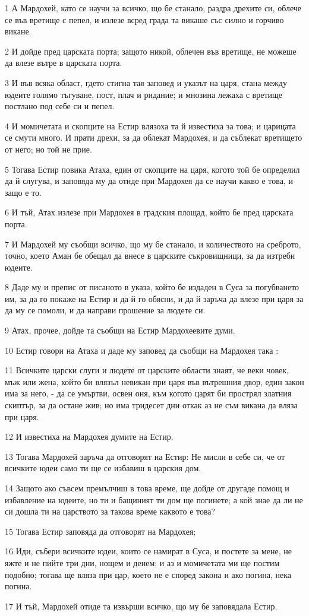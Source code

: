 \par 1 А Мардохей, като се научи за всичко, що бе станало, раздра дрехите си, облече се във вретище с пепел, и излезе всред града та викаше със силно и горчиво викане.
\par 2 И дойде пред царската порта; защото никой, облечен във вретище, не можеше да влезе вътре в царската порта.
\par 3 И във всяка област, гдето стигна тая заповед и указът на царя, стана между юдеите голямо тъгуване, пост, плач и ридание; и мнозина лежаха с вретище постлано под себе си и пепел.
\par 4 И момичетата и скопците на Естир влязоха та й известиха за това; и царицата се смути много. И прати дрехи, за да облекат Мардохея, и да съблекат вретището от него; но той не прие.
\par 5 Тогава Естир повика Атаха, един от скопците на царя, когото той бе определил да й слугува, и заповяда му да отиде при Мардохея да се научи какво е това, и защо е то.
\par 6 И тъй, Атах излезе при Мардохея в градския площад, който бе пред царската порта.
\par 7 И Мардохей му съобщи всичко, що му бе станало, и количеството на среброто, точно, което Аман бе обещал да внесе в царските съкровищници, за да изтреби юдеите.
\par 8 Даде му и препис от писаното в указа, който бе издаден в Суса за погубването им, за да го покаже на Естир и да й го обясни, и да й заръча да влезе при царя за да му се помоли, и да направи прошение за людете си.
\par 9 Атах, прочее, дойде та съобщи на Естир Мардохеевите думи.
\par 10 Естир говори на Атаха и даде му заповед да съобщи на Мардохея така :
\par 11 Всичките царски слуги и людете от царските области знаят, че веки човек, мъж или жена, който би влязъл невикан при царя във вътрешния двор, един закон има за него, - да се умъртви, освен оня, към когото царят би прострял златния скиптър, за да остане жив; но има тридесет дни откак аз не съм викана да вляза при царя.
\par 12 И известиха на Мардохея думите на Естир.
\par 13 Тогава Мардохей заръча да отговорят на Естир: Не мисли в себе си, че от всичките юдеи само ти ще се избавиш в царския дом.
\par 14 Защото ако съвсем премълчиш в това време, ще дойде от другаде помощ и избавление на юдеите, но ти и бащиният ти дом ще погинете; а кой знае да ли не си дошла ти на царството за такова време каквото е това?
\par 15 Тогава Естир заповяда да отговорят на Мардохея;
\par 16 Иди, събери всичките юдеи, които се намират в Суса, и постете за мене, не яжте и не пийте три дни, нощем и денем; и аз и момичетата ми ще постим подобно; тогава ще вляза при цар, което не е според закона и ако погина, нека погина.
\par 17 И тъй, Мардохей отиде та извърши всичко, що му бе заповядала Естир.

